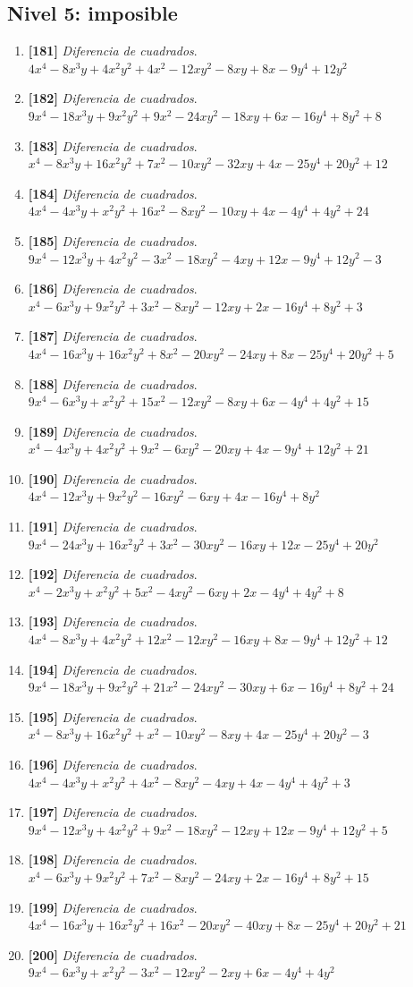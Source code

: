 \documentclass[11pt,a4paper]{article}
\newcommand{\nivel}[2]{\subsection*{Nivel #1: #2}\addcontentsline{toc}{subsection}{Nivel #1: #2}}
\newcommand{\ejercicio}[3]{\item \textbf{[#1]} \textit{#2}. $ #3 $}
\begin{document}
\nivel{5}{imposible}
\begin{enumerate}
\ejercicio{181}{Diferencia de cuadrados}{4 x^{4} - 8 x^{3} y + 4 x^{2} y^{2} + 4 x^{2} - 12 x y^{2} - 8 x y + 8 x - 9 y^{4} + 12 y^{2}}
\ejercicio{182}{Diferencia de cuadrados}{9 x^{4} - 18 x^{3} y + 9 x^{2} y^{2} + 9 x^{2} - 24 x y^{2} - 18 x y + 6 x - 16 y^{4} + 8 y^{2} + 8}
\ejercicio{183}{Diferencia de cuadrados}{x^{4} - 8 x^{3} y + 16 x^{2} y^{2} + 7 x^{2} - 10 x y^{2} - 32 x y + 4 x - 25 y^{4} + 20 y^{2} + 12}
\ejercicio{184}{Diferencia de cuadrados}{4 x^{4} - 4 x^{3} y + x^{2} y^{2} + 16 x^{2} - 8 x y^{2} - 10 x y + 4 x - 4 y^{4} + 4 y^{2} + 24}
\ejercicio{185}{Diferencia de cuadrados}{9 x^{4} - 12 x^{3} y + 4 x^{2} y^{2} - 3 x^{2} - 18 x y^{2} - 4 x y + 12 x - 9 y^{4} + 12 y^{2} - 3}
\ejercicio{186}{Diferencia de cuadrados}{x^{4} - 6 x^{3} y + 9 x^{2} y^{2} + 3 x^{2} - 8 x y^{2} - 12 x y + 2 x - 16 y^{4} + 8 y^{2} + 3}
\ejercicio{187}{Diferencia de cuadrados}{4 x^{4} - 16 x^{3} y + 16 x^{2} y^{2} + 8 x^{2} - 20 x y^{2} - 24 x y + 8 x - 25 y^{4} + 20 y^{2} + 5}
\ejercicio{188}{Diferencia de cuadrados}{9 x^{4} - 6 x^{3} y + x^{2} y^{2} + 15 x^{2} - 12 x y^{2} - 8 x y + 6 x - 4 y^{4} + 4 y^{2} + 15}
\ejercicio{189}{Diferencia de cuadrados}{x^{4} - 4 x^{3} y + 4 x^{2} y^{2} + 9 x^{2} - 6 x y^{2} - 20 x y + 4 x - 9 y^{4} + 12 y^{2} + 21}
\ejercicio{190}{Diferencia de cuadrados}{4 x^{4} - 12 x^{3} y + 9 x^{2} y^{2} - 16 x y^{2} - 6 x y + 4 x - 16 y^{4} + 8 y^{2}}
\ejercicio{191}{Diferencia de cuadrados}{9 x^{4} - 24 x^{3} y + 16 x^{2} y^{2} + 3 x^{2} - 30 x y^{2} - 16 x y + 12 x - 25 y^{4} + 20 y^{2}}
\ejercicio{192}{Diferencia de cuadrados}{x^{4} - 2 x^{3} y + x^{2} y^{2} + 5 x^{2} - 4 x y^{2} - 6 x y + 2 x - 4 y^{4} + 4 y^{2} + 8}
\ejercicio{193}{Diferencia de cuadrados}{4 x^{4} - 8 x^{3} y + 4 x^{2} y^{2} + 12 x^{2} - 12 x y^{2} - 16 x y + 8 x - 9 y^{4} + 12 y^{2} + 12}
\ejercicio{194}{Diferencia de cuadrados}{9 x^{4} - 18 x^{3} y + 9 x^{2} y^{2} + 21 x^{2} - 24 x y^{2} - 30 x y + 6 x - 16 y^{4} + 8 y^{2} + 24}
\ejercicio{195}{Diferencia de cuadrados}{x^{4} - 8 x^{3} y + 16 x^{2} y^{2} + x^{2} - 10 x y^{2} - 8 x y + 4 x - 25 y^{4} + 20 y^{2} - 3}
\ejercicio{196}{Diferencia de cuadrados}{4 x^{4} - 4 x^{3} y + x^{2} y^{2} + 4 x^{2} - 8 x y^{2} - 4 x y + 4 x - 4 y^{4} + 4 y^{2} + 3}
\ejercicio{197}{Diferencia de cuadrados}{9 x^{4} - 12 x^{3} y + 4 x^{2} y^{2} + 9 x^{2} - 18 x y^{2} - 12 x y + 12 x - 9 y^{4} + 12 y^{2} + 5}
\ejercicio{198}{Diferencia de cuadrados}{x^{4} - 6 x^{3} y + 9 x^{2} y^{2} + 7 x^{2} - 8 x y^{2} - 24 x y + 2 x - 16 y^{4} + 8 y^{2} + 15}
\ejercicio{199}{Diferencia de cuadrados}{4 x^{4} - 16 x^{3} y + 16 x^{2} y^{2} + 16 x^{2} - 20 x y^{2} - 40 x y + 8 x - 25 y^{4} + 20 y^{2} + 21}
\ejercicio{200}{Diferencia de cuadrados}{9 x^{4} - 6 x^{3} y + x^{2} y^{2} - 3 x^{2} - 12 x y^{2} - 2 x y + 6 x - 4 y^{4} + 4 y^{2}}
\end{enumerate}
\end{document}

